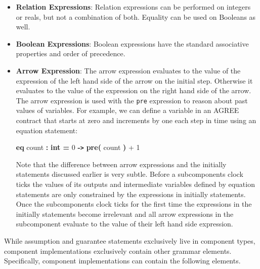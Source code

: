 \documentclass{llncs}
\begin{document}
\begin{itemize}
\item \textbf{Relation Expressions}: Relation expressions can be performed on integers or reals, but not a combination of both.  Equality can be used on Booleans as well.

\item \textbf{Boolean Expressions}: Boolean expressions have the standard associative properties and order of precedence. 

\item \textbf{Arrow Expression}: The arrow expression evaluates to the value of the expression of the left hand side of the arrow on the initial step. Otherwise it evaluates to the value of the expression on the right hand side of the arrow.  The arrow expression is used with the \texttt{pre} expression to reason about past values of variables. For example, we can define a variable in an AGREE contract that starts at zero and increments by one each step in time using an equation statement:

\begin{center}
{\color{color18} \textbf{eq}} count {\color{color18} \textbf{:}} {\color{color18} \textbf{int = }} 0 {\color{color18} \textbf{-\texttt{>}}}
{\color{color18} \textbf{pre(}} count {\color{color18} \textbf{)}} + 1
\end{center}

Note that the difference between arrow expressions and the initially statements discussed earlier is very subtle.  Before a subcomponents clock ticks the values of its outputs and intermediate variables defined by equation statements are only constrained by the expressions in initially statements.  Once the subcomponents clock ticks for the first time the expressions in the initially statements become irrelevant and all arrow expressions in the subcomponent evaluate to the value of their left hand side expression.

\end{itemize}  


While assumption and guarantee statements exclusively live in component types, component implementations exclusively contain other grammar elements. Specifically, component implementations can contain the following elements.
\end{document}
